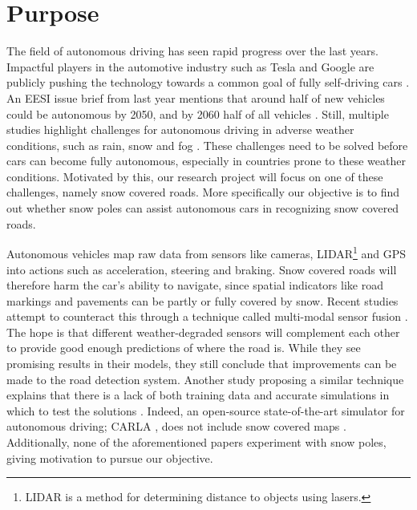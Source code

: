 \section*{Purpose}
The field of autonomous driving has seen rapid progress over the last years. Impactful players in the automotive industry such as Tesla and Google are publicly pushing the technology towards a common goal of fully self-driving cars \cite{tesla-ai-day-2021, waymo-cvpr-2022}. An EESI issue brief from last year mentions that around half of new vehicles could be autonomous by 2050, and by 2060 half of all vehicles \cite{issue-brief-autonomous-vehicles}. 
Still, multiple studies highlight challenges for autonomous driving in adverse weather conditions, such as rain, snow and fog \cite{impact-of-adverse-weather-conditions, Sensor-Fusion-Based-Semantic-Segmentation}. These challenges need to be solved before cars can become fully autonomous, especially in countries prone to these weather conditions. Motivated by this, our research project will focus on one of these challenges, namely snow covered roads. More specifically our objective is to find out whether 
snow poles can assist autonomous cars in recognizing snow covered roads. %

Autonomous vehicles map raw data from sensors like cameras, LIDAR\footnote{LIDAR is a method for determining distance to objects using lasers.} and GPS into actions such as acceleration, steering and braking. Snow covered roads will therefore harm the car's ability to navigate, since spatial indicators like road markings and pavements can be partly or fully covered by snow.
Recent studies attempt to counteract this through a technique called multi-modal sensor fusion \cite{path-detection-using-cnn-sensor-fusion, towards-autonomous-driving-in-arctic-areas}. The hope is that different weather-degraded sensors will complement each other to provide good enough predictions of where the road is. While they see promising results in their models, they still conclude that improvements can be made to the road detection system.
Another study proposing a similar technique explains that there is a lack of both training data and accurate simulations in which to test the solutions \cite{Autonomous-Steering-in-Adverse-Road-and-Weather-Conditions}. Indeed, an open-source state-of-the-art simulator for autonomous driving; CARLA \cite{carla-an-inside-out, survey-simulators}, does not include snow covered maps \cite{carla-maps}. Additionally, none of the aforementioned papers experiment with snow poles, giving motivation to pursue our objective.


